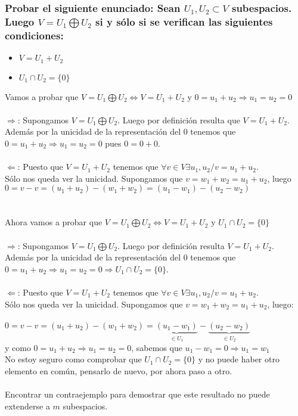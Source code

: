 \documentclass{article}
\begin{document}
\subsubsection{Probar el siguiente enunciado: Sean $U_1,U_2 \subset V$ subespacios. Luego $V = U_1 \bigoplus U_2$ si y sólo si se
verifican las siguientes condiciones: }
\begin{itemize}
	\item $V = U_1 + U_2$
	\item $U_1 \cap U_2 = \{ 0 \}$
\end{itemize}
Vamos a probar que $V = U_1 \bigoplus U_2 \Leftrightarrow V = U_1 + U_2$ y $0 = u_1 + u_2 \Rightarrow u_1 = u_2 = 0$ \\
\\
$\Rightarrow$: Supongamos $V = U_1 \bigoplus U_2$. Luego por definición resulta que $V = U_1 + U_2$. Además por la unicidad
de la representación del 0 tenemos que $0 = u_1+u_2 \Rightarrow u_1 = u_2 = 0$ pues $0 = 0 + 0$. \\ \\
$\Leftarrow$: Puesto que $V = U_1 + U_2$ tenemos que $\forall v \in V \exists u_1,u_2 / v = u_1 + u_2$. \\
Sólo nos queda ver la unicidad. Supongamos que $v = w_1 + w_2 = u_1 + u_2$, luego \\
$0 = v-v = (u_1 + u_2) - (w_1 + w_2) = (u_1 - w_1) - (u_2 - w_2) $ \\ \\
\\
Ahora vamos a probar que $V = U_1 \bigoplus U_2 \Longleftrightarrow V = U_1 + U_2$ y $U_1 \cap U_2 = \{ 0\}$ \\ \\
$\Rightarrow$: Supongamos $V = U_1 \bigoplus U_2$. Luego por definición resulta $V = U_1 + U_2$. Además por la unicidad de la
representación del 0 tenemos que $0 = u_1 + u_2 \Rightarrow u_1 = u_2 = 0 \Rightarrow U_1 \cap U_2 = \{ 0 \}$.  \\ \\
$\Leftarrow$: Puesto que $V =  U_1+U_2$ tenemos que $\forall v \in V \exists u_1,u_2 / v = u_1 + u_2.$ \\
Sólo nos queda ver la unicidad. Supongamos que $v = w_1 + w_2 = u_1 + u_2$, luego: \\ \\
$0 = v-v = (u_1+u_2) - (w_1+w_2) = \underbrace{(u_1 - w_1)}_{\in U_1} - \underbrace{(u_2 - w_2)}_{\in U_2}$ \\
y como $0 = u_1 + u_2 \Rightarrow u_1 = u_2 = 0$, sabemos que $u_1 - w_1 = 0 \Rightarrow u_1 = w_1$ \\
No estoy seguro como comprobar que $U_1 \cap U_2 = \{ 0 \}$ y no puede haber otro elemento en común, pensarlo de nuevo, por ahora paso a otro. \\ \\
Encontrar un contraejemplo para demostrar que este resultado no puede extenderse a $m$ subespacios.
\end{document}
